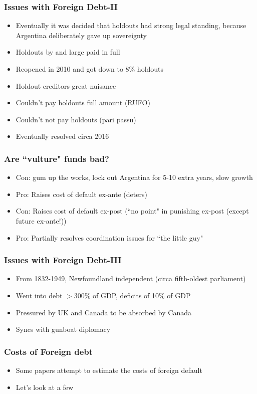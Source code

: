 \documentclass{beamer}
\begin{document}
\begin{frame}
\frametitle{Issues with Foreign Debt-II }
\begin{itemize}
\item Eventually it was decided that holdouts had strong legal standing, because Argentina deliberately gave up sovereignty
\bigskip
\item Holdouts by and large paid in full
\bigskip
\item Reopened in 2010 and got down to 8\% holdouts
\bigskip
\item Holdout creditors great nuisance
\bigskip
\item Couldn't pay holdouts full amount (RUFO)
\bigskip
\item Couldn't not pay holdouts (pari passu)
\bigskip
\item Eventually resolved circa 2016
\end{itemize}
\end{frame}

\begin{frame}
\frametitle{Are ``vulture" funds bad?}
\begin{itemize}
\item Con: gum up the works, lock out Argentina for 5-10 extra years, slow growth
\bigskip
\item Pro: Raises cost of default ex-ante (deters)
\bigskip
\item Con:  Raises cost of default ex-post (``no point" in punishing ex-post (except future ex-ante!))
\bigskip
\item Pro: Partially resolves coordination issues for ``the little guy"
\end{itemize}
\end{frame}

\begin{frame}
\frametitle{Issues with Foreign Debt-III }
\begin{itemize}
\item From 1832-1949, Newfoundland independent (circa fifth-oldest parliament)
\bigskip
\item Went into debt $>$300\% of GDP, deficits of 10\% of GDP
\bigskip
\item Pressured by UK and Canada to be absorbed by Canada
\bigskip
\item Syncs with gunboat diplomacy
\end{itemize}
\end{frame}

\begin{frame}
\frametitle{Costs of Foreign debt }
\begin{itemize}
\item Some papers attempt to estimate the costs of foreign default
\bigskip
\item Let's look at a few
\end{itemize}
\end{frame}
\end{document}

